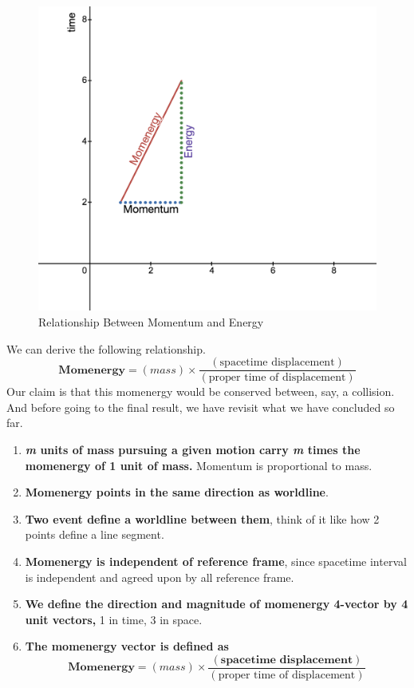 \documentclass[12pt]{book}
\newcommand{\paren}[1]{\left( #1 \right)}
\begin{document}
\begin{figure}[!h]
    \centering
    \includegraphics[width=0.5\linewidth]{picture/momentum-energy.png}
    \caption{Relationship Between Momentum and Energy}
    \label{fig:enter-label}
\end{figure}
\newpage
We can derive the following relationship. 
\[
\textbf{Momenergy} = \paren{mass}\times \frac{\paren{\text{spacetime displacement}}}{\paren{\text{proper time of displacement}}}
\]
Our claim is that this momenergy would be conserved between, say, a collision. And before going to the final result, we have revisit what we have concluded so far.
\begin{enumerate}
    \item \textbf{\textit{m} units of mass pursuing a given motion carry \textit{m} times the momenergy of 1 unit of mass.} Momentum is proportional to mass.
    \item \textbf{Momenergy points in the same direction as worldline}.
    \item \textbf{Two event define a worldline between them}, think of it like how 2 points define a line segment.
    \item \textbf{Momenergy is independent of reference frame}, since spacetime interval is independent and agreed upon by all reference frame.
    \item \textbf{We define the direction and magnitude of momenergy 4-vector by 4 unit vectors,} 1 in time, 3 in space. 
    \item \textbf{The momenergy vector is defined as}
    \[
\textbf{Momenergy} = \paren{mass}\times \frac{\paren{\textbf{spacetime displacement}}}{\paren{\text{proper time of displacement}}}
\]
\end{enumerate}
\end{document}
